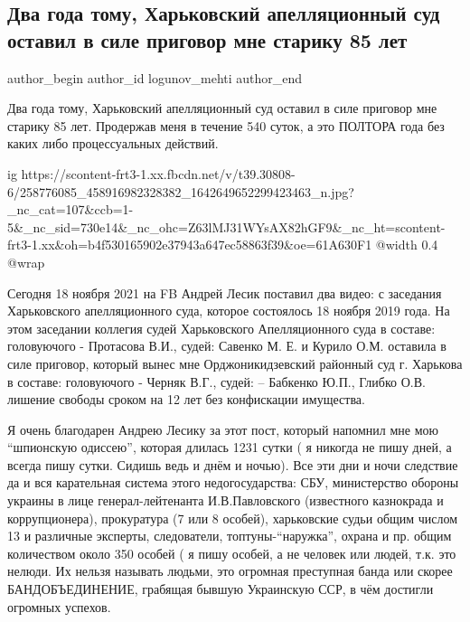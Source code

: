  
 
 
 
 
 
\subsection{Два года тому, Харьковский апелляционный суд оставил в силе приговор мне старику 85 лет}
\label{sec:18_11_2021.fb.logunov_mehti.1.prigovor}
 
\ifcmt
 author_begin
   author_id logunov_mehti
 author_end
\fi

Два года тому, Харьковский апелляционный суд оставил в силе приговор мне
старику 85 лет. Продержав меня в течение 540 суток, а это ПОЛТОРА года без
каких либо процессуальных действий.

\ifcmt
  ig https://scontent-frt3-1.xx.fbcdn.net/v/t39.30808-6/258776085_458916982328382_1642649652299423463_n.jpg?_nc_cat=107&ccb=1-5&_nc_sid=730e14&_nc_ohc=Z63lMJ31WYsAX82hGF9&_nc_ht=scontent-frt3-1.xx&oh=b4f530165902e37943a647ec58863f39&oe=61A630F1
  @width 0.4
  @wrap 
\fi

Сегодня 18 ноября 2021 на FB Андрей Лесик поставил два видео:  с заседания
Харьковского апелляционного суда, которое состоялось 18 ноября 2019 года. На
этом заседании  коллегия судей Харьковского  Апелляционного суда  в составе:
головуючого - Протасова В.И., судей: Савенко М. Е. и Курило О.М. оставила в силе
приговор, который вынес мне Орджоникидзевский районный суд г. Харькова в
составе: головуючого - Черняк В.Г., судей: – Бабкенко Ю.П., Глибко О.В. лишение
свободы сроком на 12 лет без конфискации имущества. 

Я очень благодарен Андрею Лесику за этот пост, который напомнил мне мою
\enquote{шпионскую  одиссею}, которая длилась 1231 сутки ( я никогда не пишу дней, а
всегда пишу сутки. Сидишь ведь и днём и ночью). Все эти дни и ночи следствие да
и вся карательная система  этого недогосударства: СБУ,  министерство обороны
украины в лице генерал-лейтенанта И.В.Павловского (известного казнокрада и
коррупционера),  прокуратура (7 или 8 особей),  харьковские судьи общим числом
13 и различные эксперты, следователи, топтуны-\enquote{наружка}, охрана и пр. общим
количеством  около 350 особей ( я пишу особей, а не человек или людей, т.к.
это нелюди. Их нельзя называть людьми, это огромная преступная банда или скорее
БАНДОБЪЕДИНЕНИЕ, грабящая бывшую Украинскую ССР, в чём достигли огромных
успехов. 

